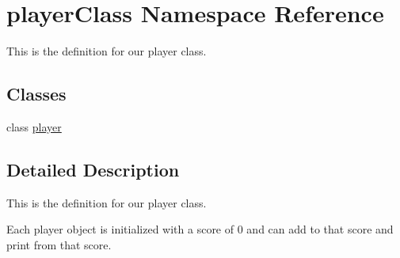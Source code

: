 \hypertarget{namespaceplayerClass}{}\section{player\+Class Namespace Reference}
\label{namespaceplayerClass}


This is the definition for our player class.  


\subsection*{Classes}
\begin{DoxyCompactItemize}
\item 
class \hyperlink{classplayerClass_1_1player}{player}
\end{DoxyCompactItemize}


\subsection{Detailed Description}
This is the definition for our player class. 

Each player object is initialized with a score of 0 and can add to that score and print from that score. 